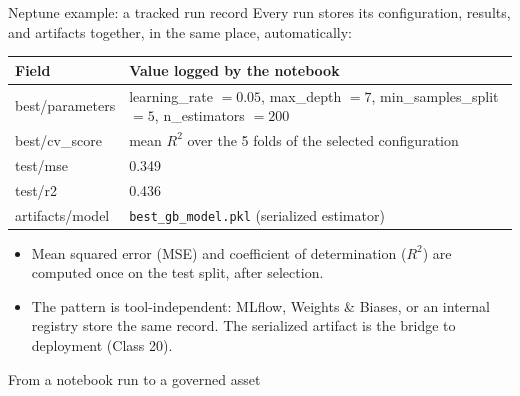 \begin{frame}{Neptune example: a tracked run record}
\begingroup\footnotesize
Every run stores its configuration, results, and artifacts together, in the same place, automatically:
\par\endgroup
\vspace{0.4em}
\centering
\begingroup\footnotesize
\renewcommand{\arraystretch}{1.2}
\begin{tabularx}{0.9\textwidth}{>{\ttfamily}l X}
\normalfont\bfseries Field & \bfseries Value logged by the notebook \\
\toprule
best/parameters & learning\_rate $= 0.05$, max\_depth $= 7$, min\_samples\_split $= 5$, n\_estimators $= 200$ \\
best/cv\_score & mean $R^2$ over the 5 folds of the selected configuration \\
test/mse & 0.349 \\
test/r2 & 0.436 \\
artifacts/model & \texttt{best\_gb\_model.pkl} (serialized estimator) \\
\bottomrule
\end{tabularx}
\par\endgroup
\vspace{0.5em}
\begin{itemize}\footnotesize
\item Mean squared error (MSE) and coefficient of determination ($R^2$) are computed once on the test split, after selection.
\item The pattern is tool-independent: MLflow, Weights \& Biases, or an internal registry store the same record. The serialized artifact is the bridge to deployment (Class 20).
\end{itemize}
\coursefooter
\end{frame}

\begin{frame}{From a notebook run to a governed asset}
\centering
{}
\coursefooter
\end{frame}

